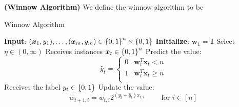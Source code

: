 \begin{definition}{\textbf{(Winnow Algorithm)}}
    We define the winnow algorithm to be 
    \begin{algorithm}[H]
        \caption{Winnow Algorithm}
        \begin{algorithmic}[1]
            \State \textbf{Input}: $(\boldsymbol x_1, y_1),\dots,(\boldsymbol x_m, y_m)\in\left\{ 0, 1 \right\}^n \times \left\{ 0, 1 \right\}$
            \State \textbf{Initialize}: $\boldsymbol w_1 = \boldsymbol 1$
            \State Select $\eta\in(0, \infty)$
                \State Receives instances $\boldsymbol x_t \in \left\{ 0, 1 \right\}^n$
                \State Predict the value:
                \begin{equation*}
                    \hat{y}_t = \begin{cases}
                        0 & \boldsymbol w_t^T\boldsymbol x_t < n \\
                        1 & \boldsymbol w_t^T\boldsymbol x_t \ge n \\
                    \end{cases}
                \end{equation*}
                \State Receives the label $y_t\in\left\{ 0, 1 \right\}$
                    \State Update the value:
                    \begin{equation*}
                        w_{t+1, i} = w_{t, i}2^{(y_t - \hat{y}_t)x_{t, i}} \qquad \text{ for } i \in [n]
                    \end{equation*}
                \EndIf
            \EndFor
        \end{algorithmic} 
    \end{algorithm}
\end{definition}

